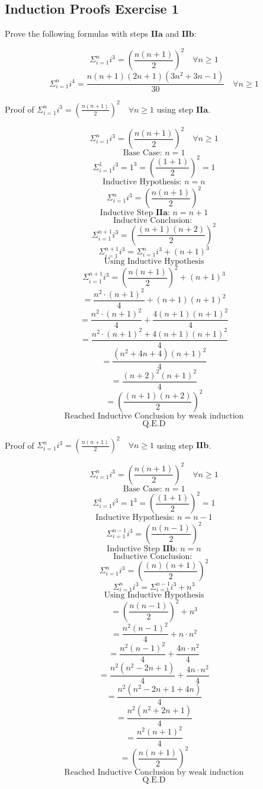 \documentclass{article}
\begin{document}
\subsection{Induction Proofs Exercise 1}

Prove the following formulas with steps $\textbf{IIa}$ and $\textbf{IIb}$:

$$\Sigma_{i=1}^{n} i^3 = (\frac{n(n + 1)}{2})^2 \quad \forall n \ge 1$$
$$\Sigma_{i=1}^{n} i^4 = \frac{n(n + 1)(2n + 1)(3n^2 + 3n - 1)}{30} \quad \forall n \ge 1$$

Proof of $\Sigma_{i=1}^{n} i^3 = (\frac{n(n + 1)}{2})^2 \quad \forall n \ge 1 $ using step $\textbf{IIa}$.

$$\Sigma_{i=1}^{n} i^3 = (\frac{n(n + 1)}{2})^2 \quad \forall n \ge 1$$
$$\text{Base Case: } n = 1$$
$$\Sigma_{i=1}^{1} i^3  = 1^3 = (\frac{(1 + 1)}{2})^2 = 1 $$
$$\text{Inductive Hypothesis: } n = n$$
$$\Sigma_{i=1}^{n} i^3 = (\frac{n(n + 1)}{2})^2 $$
$$\text{Inductive Step } \textbf{IIa} \text{: } n = n + 1$$
$$\text{Inductive Conclusion: }$$
$$\Sigma_{i=1}^{n+1} i^3 = (\frac{(n+1)(n + 2)}{2})^2 $$
$$\Sigma_{i=1}^{n+1} i^3 = \Sigma_{i=1}^{n} i^3 + (n + 1)^3 $$
$$\text{Using Inductive Hypothesis}$$
$$\Sigma_{i=1}^{n+1} i^3 = (\frac{n(n + 1)}{2})^2 + (n + 1)^3 $$
$$=\frac{n^2 \cdot (n + 1)^2}{4} + (n + 1)(n + 1)^2 $$
$$=\frac{n^2 \cdot (n + 1)^2}{4} + \frac{4(n + 1)(n + 1)^2}{4} $$
$$=\frac{n^2 \cdot (n + 1)^2 + 4(n + 1)(n + 1)^2}{4} $$
$$=\frac{(n^2 + 4n + 4)(n + 1)^2}{4} $$
$$=\frac{(n + 2)^2 (n + 1)^2}{4} $$
$$=(\frac{(n + 1)(n + 2)}{2})^2 $$
$$\text{Reached Inductive Conclusion by weak induction}$$
$$\text{Q.E.D}$$

Proof of $\Sigma_{i=1}^{n} i^3 = (\frac{n(n + 1)}{2})^2 \quad \forall n \ge 1 $ using step $\textbf{IIb}$.

$$\Sigma_{i=1}^{n} i^3 = (\frac{n(n + 1)}{2})^2 \quad \forall n \ge 1$$
$$\text{Base Case: } n = 1$$
$$\Sigma_{i=1}^{1} i^3  = 1^3 = (\frac{(1 + 1)}{2})^2 = 1 $$
$$\text{Inductive Hypothesis: } n = n - 1$$
$$\Sigma_{i=1}^{n - 1} i^3 = (\frac{n(n - 1)}{2})^2 $$
$$\text{Inductive Step } \textbf{IIb} \text{: } n = n$$
$$\text{Inductive Conclusion: }$$
$$\Sigma_{i=1}^{n} i^3 = (\frac{(n)(n + 1)}{2})^2 $$
$$\Sigma_{i=1}^{n} i^3 = \Sigma_{i=1}^{n - 1} i^3 + n^3$$
$$\text{Using Inductive Hypothesis}$$
$$= (\frac{n(n - 1)}{2})^2 + n^3$$
$$= \frac{n^2 (n - 1)^2}{4} + n \cdot n^2$$
$$= \frac{n^2 (n - 1)^2}{4} + \frac{4 n \cdot n^2}{4}$$
$$= \frac{n^2 (n^2 - 2n + 1)}{4} + \frac{4 n \cdot n^2}{4}$$
$$= \frac{n^2 (n^2 - 2n + 1 + 4n)}{4}$$
$$= \frac{n^2 (n^2 + 2n + 1)}{4}$$
$$= \frac{n^2 (n + 1)^2}{4}$$
$$= (\frac{n(n + 1)}{2})^2$$
$$\text{Reached Inductive Conclusion by weak induction}$$
$$\text{Q.E.D}$$
\end{document}
